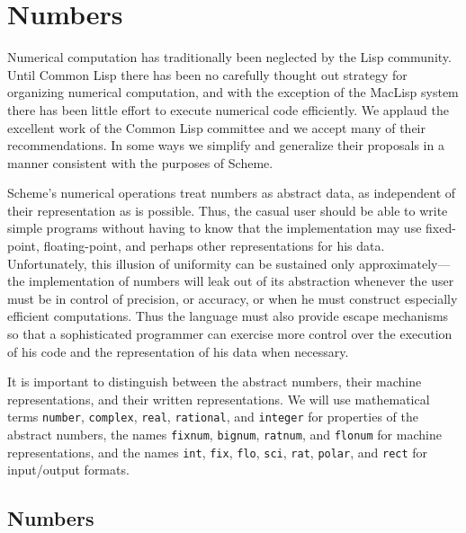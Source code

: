 \section{Numbers}
\label{numbersection}

Numerical computation has traditionally been neglected by the Lisp
community.  Until Common Lisp there has been no carefully thought out
strategy for organizing numerical computation, and with the exception of
the MacLisp system \cite{Pitman83} there has been little effort to
execute numerical code efficiently.  We applaud the excellent work of
the Common Lisp committee and we accept many of their recommendations.
In some ways we simplify and generalize their proposals in a manner
consistent with the purposes of Scheme.

\vest Scheme's numerical operations treat numbers as abstract data, as
independent of their representation as is possible.  Thus, the casual user
should be able to write simple programs without having to know that the
implementation may use fixed-point, floating-point, and perhaps other
representations for his data.  Unfortunately, this illusion of uniformity
can be sustained only approximately---the implementation of numbers will
leak out of its abstraction whenever the user must be in control of
precision, or accuracy, or when he must construct especially efficient
computations.  Thus the language must also provide escape mechanisms so
that a sophisticated programmer can exercise more control over the
execution of his code and the representation of his data when necessary.

\newcommand{\type}[1]{{\tt#1}}

\vest It is important to distinguish between the abstract numbers, their
machine representations, and their written representations.  We will use
mathematical terms \type{number}, \type{complex}, \type{real},
\type{rational}, and \type{integer} for properties of the abstract
numbers, the names \type{fixnum}, \type{bignum}, \type{ratnum}, and
\type{flonum} for machine representations, and the names
\type{int}, \type{fix}, \type{flo}, \type{sci}, \type{rat},
\type{polar}, and \type{rect} for input/output formats. 


 
\subsection{Numbers}


